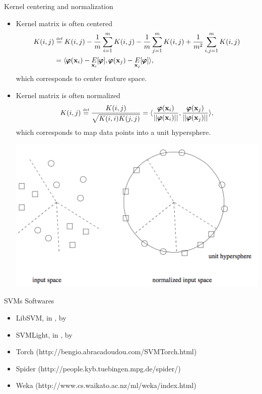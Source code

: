 \documentclass[first=dgreen,second=purple,logo=yellowexc]{aaltoslides}
\begin{document}
{\begin{frame}{Kernel centering and normalization}
	\begin{itemize}
		\item Kernel matrix is often centered
		\begin{align*}
			K(i,j) &\overset{{\rm \mbox{\tiny def}}}{=} K(i,j)-\frac{1}{m}\sum_{i=1}^mK(i,j)-\frac{1}{m}\sum_{j=1}^mK(i,j)+\frac{1}{m^2}\sum_{i,j=1}^mK(i,j)\\
			&=\langle \pmb \varphi(\mathbf {x}_i)-\underset{\mathbf {x}_i}{E}[\pmb \varphi], \pmb \varphi(\mathbf {x}_j)-\underset{\mathbf {x}_j}{E}[\pmb \varphi] \rangle,
		\end{align*}
		which corresponds to center feature space.
		\item Kernel matrix is often normalized
		\begin{align*}
			K(i,j) \overset{{\rm \mbox{\tiny def}}}{=} \frac{K(i,j)}{\sqrt{K(i,i)K(j,j)}}= \langle \frac{\pmb \varphi(\mathbf {x}_i)}{||\pmb \varphi(\mathbf {x}_i)||}, \frac{\pmb \varphi(\mathbf {x}_j)}{||\pmb \varphi(\mathbf {x}_j)||} \rangle,
		\end{align*}
		which corresponds to map data points into a unit hypersphere.
		\begin{center}
			\includegraphics[scale=0.25]{./figures/kernelnormalization.png}
		\end{center}
	\end{itemize}
\end{frame}

\begin{frame}{SVMs Softwares}
	\begin{itemize}
		\item LibSVM, in \cpp, by \citet{Chang11libsvm}
		\item SVMLight, in \ccc, by \citet{Joachims98making}
		\item Torch (http://bengio.abracadoudou.com/SVMTorch.html)
		\item Spider (http://people.kyb.tuebingen.mpg.de/spider/)
		\item Weka (http://www.cs.waikato.ac.nz/ml/weka/index.html)
	\end{itemize}
\end{frame}

}
\end{document}
